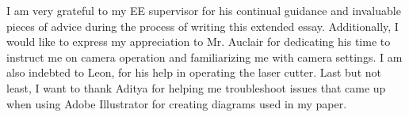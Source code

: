\documentclass[12pt, oneside]{article}
\begin{document}
I am very grateful to my EE supervisor for his continual guidance and invaluable pieces of advice during the process of writing this extended essay. Additionally, I would like to express my appreciation to Mr. Auclair for dedicating his time to instruct me on camera operation and familiarizing me with camera settings. I am also indebted to Leon, for his help in operating the laser cutter. Last but not least, I want to thank Aditya for helping me troubleshoot issues that came up when using Adobe Illustrator for creating diagrams used in my paper.

\clearpage
\pagestyle{backmatter}
\printbibliography[heading=bibintoc]{}

\clearpage
\begin{appendices}
    \pagestyle{appendices}
    
    
    
\end{appendices}
\end{document}
